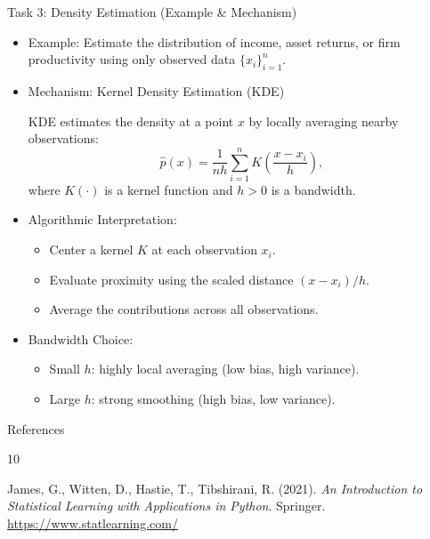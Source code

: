 \documentclass[aspectratio=169]{beamer}
\newcommand{\1}{\mathbf{1}}
\begin{document}
\begin{frame}{Task 3: Density Estimation (Example \& Mechanism)}
    \small
    \begin{itemize}
        \item Example:
        Estimate the distribution of income, asset returns, or firm productivity
        using only observed data $\{x_i\}_{i=1}^n$.
        
        \item Mechanism: Kernel Density Estimation (KDE)
        
        KDE estimates the density at a point $x$ by locally averaging nearby observations:
        \[
            \hat{p}(x)
            =
            \frac{1}{nh}
            \sum_{i=1}^n
            K\!\left(\frac{x - x_i}{h}\right),
        \]
        where $K(\cdot)$ is a kernel function and $h>0$ is a bandwidth.
        
        \item Algorithmic Interpretation:
        \begin{itemize}
            \item Center a kernel $K$ at each observation $x_i$.
            \item Evaluate proximity using the scaled distance $(x-x_i)/h$.
            \item Average the contributions across all observations.
        \end{itemize}
        
        \item Bandwidth Choice:
        \begin{itemize}
            \item Small $h$: highly local averaging (low bias, high variance).
            \item Large $h$: strong smoothing (high bias, low variance).
        \end{itemize}
    \end{itemize}
\end{frame}

\begin{frame}{References}
    \begin{thebibliography}{10}
        
        James, G., Witten, D., Hastie, T., Tibshirani, R. (2021).
        \newblock \textit{An Introduction to Statistical Learning with Applications in Python}.
        \newblock Springer.
        \newblock \url{https://www.statlearning.com/}
        

        
    \end{thebibliography}
\end{frame}
\end{document}
